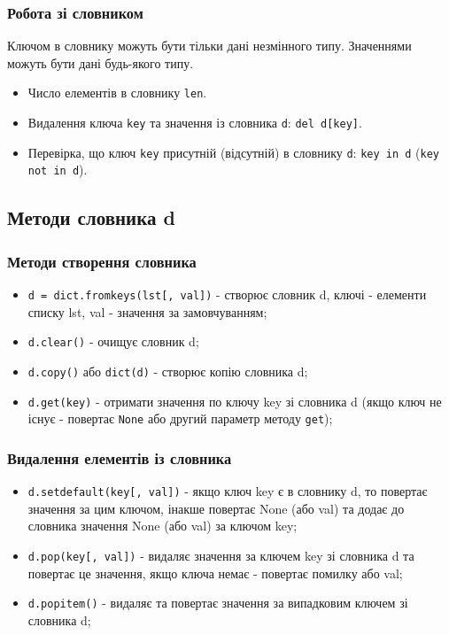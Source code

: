 \begin{frame}
\frametitle{Робота зі словником}
Ключом в словнику можуть бути тільки дані незмінного типу. Значеннями можуть бути дані будь-якого типу.

\begin{itemize}
  \item Число елементів в словнику \texttt{len}.
  
  \item Видалення ключа \texttt{key} та значення із словника \texttt{d}: \texttt{del d[key]}.
  \item Перевірка, що ключ \texttt{key} присутній (відсутній) в словнику \texttt{d}: \texttt{key in d} (\texttt{key not in d}).
\end{itemize}
\end{frame}

\subsection{Методи словника d} 

\begin{frame}
\frametitle{Методи створення словника}
    \begin{itemize}
        \item<1-> \texttt{d = dict.fromkeys(lst[, val])} - створює словник d, ключі - елементи списку lst, val - значення за замовчуванням;
        \item<2-> \texttt{d.clear()} - очищує словник d;
        \item<3-> \texttt{d.copy()} або \texttt{dict(d)} - створює копію словника d;
        \item<4-> \texttt{d.get(key)} - отримати значення по ключу key зі словника d (якщо ключ не існує - повертає \texttt{None} або другий параметр методу \texttt{get});
    \end{itemize}
\end{frame}

\begin{frame}
\frametitle{Видалення елементів із словника}
    \begin{itemize}
        \item<1-> \texttt{d.setdefault(key[, val])} - якщо ключ key є в словнику d, то повертає значення за цим ключом, інакше повертає None (або val) та додає до словника значення None (або val) за ключом key;
        \item<2-> \texttt{d.pop(key[, val])} - видаляє значення за ключем key зі словника d та повертає це значення, якщо ключа немає - повертає помилку або val;
        \item<3-> \texttt{d.popitem()} - видаляє та повертає значення за випадковим ключем зі словника d;
    \end{itemize}
\end{frame}

